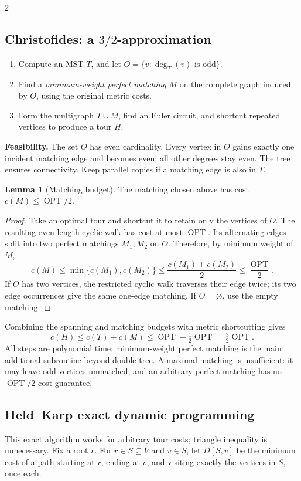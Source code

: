 \documentclass[10pt]{article}
\theoremstyle{definition}
\newtheorem{lemma}[definition]{Lemma}
\newcommand{\OPT}{\operatorname{OPT}}
\begin{document}
\begin{multicols*}{2}
\subsection{Christofides: a \texorpdfstring{$3/2$}{3/2}-approximation}\label{tsp:christofides}
\begin{enumerate}
  \item Compute an MST $T$, and let $O=\{v:\deg_T(v)\text{ is odd}\}$.
  \item Find a \emph{minimum-weight perfect matching} $M$ on the complete
        graph induced by $O$, using the original metric costs.
  \item Form the multigraph $T\cup M$, find an Euler circuit, and shortcut
        repeated vertices to produce a tour $H$.
\end{enumerate}
\textbf{Feasibility.} The set $O$ has even cardinality.  Every vertex in
$O$ gains exactly one incident matching edge and becomes even; all other
degrees stay even.  The tree ensures connectivity.  Keep parallel copies
if a matching edge is also in $T$.

\begin{lemma}[Matching budget]
The matching chosen above has cost $c(M)\le\OPT/2$.
\end{lemma}
\begin{proof}
Take an optimal tour and shortcut it to retain only the vertices of $O$.
The resulting even-length cyclic walk has cost at most $\OPT$.  Its
alternating edges split into two perfect matchings $M_1,M_2$ on $O$.
Therefore, by minimum weight of $M$,
\[
c(M)\le\min\{c(M_1),c(M_2)\}
\le\frac{c(M_1)+c(M_2)}2\le\frac{\OPT}2.
\]
If $O$ has two vertices, the restricted cyclic walk traverses their edge
twice; its two edge occurrences give the same one-edge matching.  If
$O=\varnothing$, use the empty matching.
\end{proof}
Combining the spanning and matching budgets with metric shortcutting gives
\[
\boxed{\ c(H)\le c(T)+c(M)\le\OPT+\tfrac12\OPT
       =\tfrac32\OPT.\ }
\]
All steps are polynomial time; minimum-weight perfect matching is the main
additional subroutine beyond double-tree.  A maximal matching is insufficient:
it may leave odd vertices unmatched, and an arbitrary perfect matching has
no $\OPT/2$ cost guarantee.

\subsection{Held--Karp exact dynamic programming}\label{tsp:heldkarp}
This exact algorithm works for arbitrary tour costs; triangle inequality
is unnecessary.  Fix a root $r$.  For $r\in S\subseteq V$ and $v\in S$,
let $D[S,v]$ be the minimum cost of a path starting at $r$, ending at $v$,
and visiting exactly the vertices in $S$, once each.


\end{multicols*}
\end{document}
